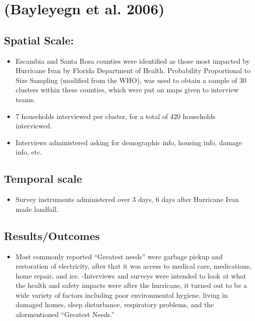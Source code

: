 \documentclass[
]{article}
\providecommand{\tightlist}{%
  \setlength{\itemsep}{0pt}\setlength{\parskip}{0pt}}
\begin{document}
\hypertarget{bayleyegn2006rapid}{%
\section{(Bayleyegn et al. 2006)}\label{bayleyegn2006rapid}}

\hypertarget{spatial-scale-1}{%
\subsection{Spatial Scale:}\label{spatial-scale-1}}

\begin{itemize}
\tightlist
\item
  Escambia and Santa Rosa counties were identified as those most
  impacted by Hurricane Ivan by Florida Department of Health.
  Probability Proportional to Size Sampling (modified from the WHO), was
  used to obtain a sample of 30 clusters within these counties, which
  were put on maps given to interview teams.
\item
  7 households interviewed per cluster, for a total of 420 households
  interviewed.
\item
  Interviews administered asking for demographic info, housing info,
  damage info, etc.
\end{itemize}

\hypertarget{temporal-scale}{%
\subsection{Temporal scale}\label{temporal-scale}}

\begin{itemize}
\tightlist
\item
  Survey instruments administered over 3 days, 6 days after Hurricane
  Ivan made landfall.
\end{itemize}

\hypertarget{resultsoutcomes-1}{%
\subsection{Results/Outcomes}\label{resultsoutcomes-1}}

\begin{itemize}
\tightlist
\item
  Most commonly reported ``Greatest needs'' were garbage pickup and
  restoration of electricity, after that it was access to medical care,
  medications, home repair, and ice. -Interviews and surveys were
  intended to look at what the health and safety impacts were after the
  hurricane, it turned out to be a wide variety of factors including
  poor environmental hygiene, living in damaged homes, sleep
  disturbance, respiratory problems, and the aformentioned ``Greatest
  Needs.''
\end{itemize}
\end{document}
